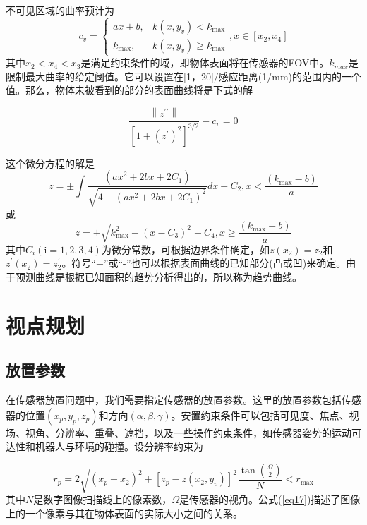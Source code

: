 \documentclass[AutoFakeBold,zihao=-4]{ctexart}
\begin{document}
	不可见区域的曲率预计为
	\begin{equation}
		c_{v}=\left\{\begin{array}{ll}
			a x+b, & k\left(x, y_{v}\right)<k_{\max } \\
			k_{\max }, & k\left(x, y_{v}\right) \geq k_{\max }
		\end{array}, x \in\left[x_{2}, x_{4}\right]\right.
		\label{eq13}
	\end{equation}
	其中$ x_{2}<x_{4}<x_{3} $是满足约束条件的域，即物体表面将在传感器的FOV中。$ k_{max} $是限制最大曲率的给定阈值。它可以设置在[1，20]/感应距离(1/mm)的范围内的一个值。那么，物体未被看到的部分的表面曲线将是下式的解
	
	\begin{equation}
		\frac{\left\|z^{\prime \prime}\right\|}{\left[1+\left(z^{\prime}\right)^{2}\right]^{3 / 2}}-c_{v}=0
		\label{eq14}
	\end{equation}

	这个微分方程的解是
	\begin{equation}
		z=\pm \int \frac{\left(a x^{2}+2 b x+2 C_{1}\right)}{\sqrt{4-\left(a x^{2}+2 b x+2 C_{1}\right)^{2}}} d x+C_{2}, x<\frac{\left(k_{\max }-b\right)}{a}
		\label{eq15}
	\end{equation}
	或
	\begin{equation}
		z=\pm \sqrt{k_{\max }^{2}-\left(x-C_{3}\right)^{2}}+C_{4}, x \geq \frac{\left(k_{\max }-b\right)}{a}
		\label{eq16}
	\end{equation}
	其中$ C_{i}(\mathrm{i}=1,2,3,4) $为微分常数，可根据边界条件确定，如$ z\left(x_{2}\right)=z_{2} $和$ z^{\prime}\left(x_{2}\right)=z_{2}^{\prime} $。符号“+”或“-”也可以根据表面曲线的已知部分(凸或凹)来确定。由于预测曲线是根据已知面积的趋势分析得出的，所以称为趋势曲线。
	
	\section{视点规划}
	\subsection{放置参数}
	在传感器放置问题中，我们需要指定传感器的放置参数\cite{chen2004automatic}。这里的放置参数包括传感器的位置$ \left(x_{p}, y_{p}, z_{p}\right) $和方向$ (\alpha, \beta, \gamma) $。安置约束条件可以包括可见度、焦点、视场、视角、分辨率、重叠、遮挡，以及一些操作约束条件，如传感器姿势的运动可达性和机器人与环境的碰撞。设分辨率约束为
	
	\begin{equation}
		r_{p}=2 \sqrt{\left(x_{p}-x_{2}\right)^{2}+\left[z_{p}-z\left(x_{2}, y_{v}\right)\right]^{2}} \frac{\tan \left(\frac{\Omega}{2}\right)}{N}<r_{\max }
		\label{eq17}
	\end{equation}
	其中$ N $是数字图像扫描线上的像素数，$ \Omega $是传感器的视角。公式(\ref{eq17})描述了图像上的一个像素与其在物体表面的实际大小之间的关系。
	
\end{document}
